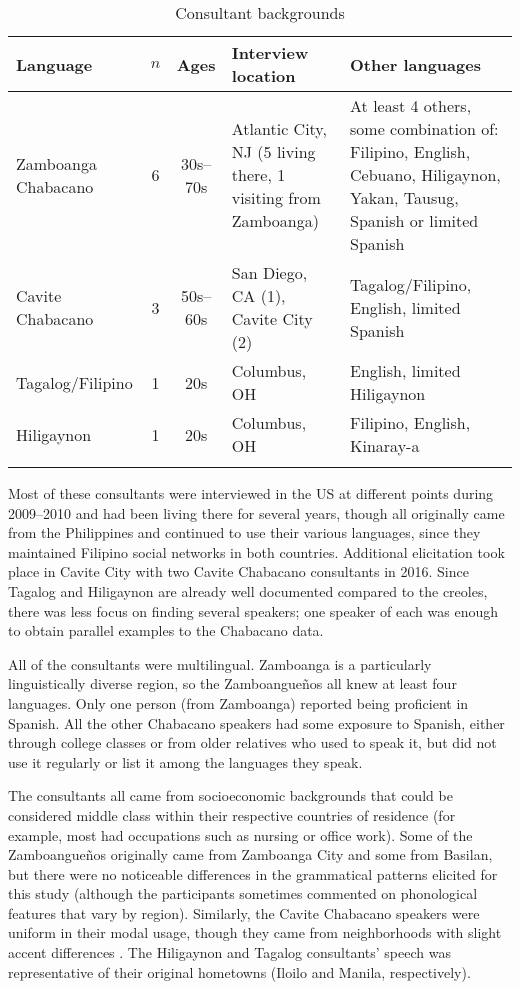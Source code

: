 \documentclass[output=paper,colorlinks,citecolor=brown]{langscibook}
\begin{document}
\begin{table}
\begin{tabularx}{\textwidth}{QccQQ}
\lsptoprule
{Language} & {$n$} & {Ages} & {Interview location} & {Other languages}\\
\midrule
Zamboanga Chabacano & 6 & 30s–70s & Atlantic City, NJ (5 living there, 1 visiting from Zamboanga) & At least 4 others, some combination of: Filipino, English, Cebuano, Hiligaynon, Yakan, Tausug, Spanish or limited Spanish\\
Cavite Chabacano    & 3 & 50s–60s & San Diego, CA (1), Cavite City (2) & Tagalog/Filipino, English, limited Spanish\\
Tagalog/Filipino    & 1 & 20s     & Columbus, OH & English, limited Hiligaynon\\
Hiligaynon          & 1 & 20s     & Columbus, OH & Filipino, English, Kinaray-a\\
\lspbottomrule
\end{tabularx}
\caption{Consultant backgrounds}
\label{tab:lesho:1}
\end{table}

Most of these consultants were interviewed in the US at different points during 2009–2010 and had been living there for several years, though all originally came from the Philippines and continued to use their various languages, since they maintained Filipino social networks in both countries. Additional elicitation took place in Cavite City with two Cavite Chabacano consultants in 2016. Since Tagalog and Hiligaynon are already well documented compared to the creoles, there was less focus on finding several speakers; one speaker of each was enough to obtain parallel examples to the Chabacano data.

All of the consultants were multilingual. Zamboanga is a particularly linguistically diverse region, so the Zamboangueños all knew at least four languages. Only one person (from Zamboanga) reported being proficient in Spanish. All the other Chabacano speakers had some exposure to Spanish, either through college classes or from older relatives who used to speak it, but did not use it regularly or list it among the languages they speak.

The consultants all came from socioeconomic backgrounds that could be considered middle class within their respective countries of residence (for example, most had occupations such as nursing or office work). Some of the Zamboangueños originally came from Zamboanga City and some from Basilan, but there were no noticeable differences in the grammatical patterns elicited for this study (although the participants sometimes commented on phonological features that vary by region). Similarly, the Cavite Chabacano speakers were uniform in their modal usage, though they came from neighborhoods with slight accent differences \citep{Lesho2018}. The Hiligaynon and Tagalog consultants’ speech was representative of their original hometowns (Iloilo and Manila, respectively).
\end{document}
